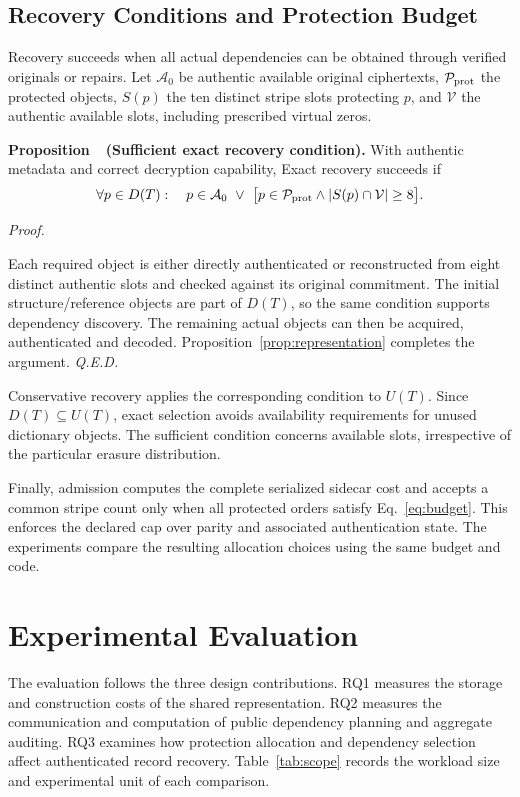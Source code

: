 \documentclass[10pt,journal]{IEEEtran}
\newcounter{proposition}
\newenvironment{proposition}[1]{%
  \refstepcounter{proposition}\par\smallskip\noindent
  \textbf{Proposition~\theproposition\ (#1). }\ignorespaces
}{\par\smallskip}
\newenvironment{claimproof}{\par\noindent\emph{Proof. }\ignorespaces
}{\hfill\textit{Q.E.D.}\par\smallskip}
\begin{document}
\subsection{Recovery Conditions and Protection Budget}\label{sec:recovery-condition}
Recovery succeeds when all actual dependencies can be obtained through
verified originals or repairs. Let $\mathcal A_0$ be authentic available original ciphertexts,
$\mathcal P_{\rm prot}$ the protected objects, $S(p)$ the ten distinct stripe
slots protecting $p$, and $\mathcal V$ the authentic available slots,
including prescribed virtual zeros.
\begin{proposition}{Sufficient exact recovery condition}\label{prop:recovery}
With authentic metadata and correct decryption capability, Exact recovery
succeeds if
\begin{equation}\label{eq:recovery-condition}
\forall p\in D(T):\quad p\in\mathcal A_0\ \lor\
\bigl[p\in\mathcal P_{\rm prot}\land|S(p)\cap\mathcal V|\geq8\bigr].
\end{equation}
\end{proposition}
\begin{claimproof}
Each required object is either directly authenticated or reconstructed from
eight distinct authentic slots and checked against its original commitment.
The initial structure/reference objects are part of $D(T)$, so the same
condition supports dependency discovery. The remaining actual objects can
then be acquired, authenticated and decoded. Proposition~\ref{prop:representation}
completes the argument.
\end{claimproof}
Conservative recovery applies the corresponding condition to $U(T)$.
Since $D(T)\subseteq U(T)$, exact selection avoids availability requirements
for unused dictionary objects. The sufficient condition concerns available
slots, irrespective of the particular erasure distribution.

Finally, admission computes the complete serialized sidecar cost and accepts
a common stripe count only when all protected orders satisfy
Eq.~\eqref{eq:budget}. This enforces the declared cap over parity and
associated authentication state. The experiments compare the resulting
allocation choices using the same budget and code.

\section{Experimental Evaluation}\label{sec:eval}
The evaluation follows the three design contributions. RQ1 measures the
storage and construction costs of the shared representation. RQ2 measures
the communication and computation of public dependency planning and aggregate
auditing. RQ3 examines how protection allocation and dependency selection
affect authenticated record recovery. Table~\ref{tab:scope} records the workload
size and experimental unit of each comparison.
\end{document}
